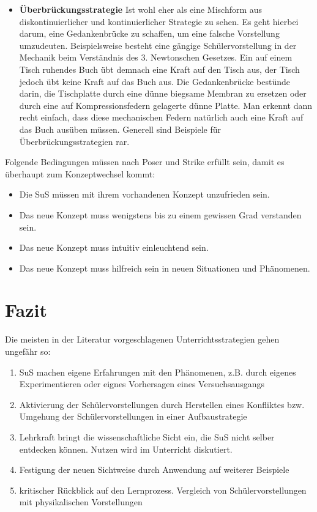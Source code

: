 \begin{itemize}
\item \textbf{{\"U}berbr{\"u}ckungsstrategie} Ist wohl eher als eine Mischform aus diskontinuierlicher und kontinuierlicher Strategie zu sehen. Es geht hierbei darum, eine Gedankenbr\"{u}cke zu schaffen, um eine falsche Vorstellung umzudeuten. Beispielsweise besteht eine g\"{a}ngige Sch\"{u}lervorstellung in der Mechanik beim Verst\"{a}ndnis des 3. Newtonschen Gesetzes. Ein auf einem Tisch ruhendes Buch \"{u}bt demnach eine Kraft auf den Tisch aus, der Tisch jedoch \"{u}bt keine Kraft auf das Buch aus. Die Gedankenbr\"{u}cke best\"{u}nde darin, die Tischplatte durch eine d\"{u}nne biegsame Membran zu ersetzen oder durch eine auf Kompressionsfedern gelagerte d\"{u}nne Platte. Man erkennt dann recht einfach, dass diese mechanischen Federn nat\"{u}rlich auch eine Kraft auf das Buch aus\"{u}ben m\"{u}ssen. Generell sind Beispiele f\"{u}r \"{U}berbr{\"u}ckungsstrategien rar.
\end{itemize}

Folgende Bedingungen m{\"u}ssen nach Poser und Strike erf{\"u}llt sein, damit es {\"u}berhaupt zum Konzeptwechsel kommt:

\begin{itemize}
\item Die SuS m{\"u}ssen mit ihrem vorhandenen Konzept unzufrieden sein.
\item Das neue Konzept muss wenigstens bis zu einem gewissen Grad verstanden sein.
\item Das neue Konzept muss intuitiv einleuchtend sein.
\item Das neue Konzept muss hilfreich sein in neuen Situationen und Ph{\"a}nomenen.
\end{itemize}

\bip\bip
\section{Fazit}
Die meisten in der Literatur vorgeschlagenen Unterrichtsstrategien gehen ungef{\"a}hr so:

\begin{enumerate}
\item 
SuS machen eigene Erfahrungen mit den Ph{\"a}nomenen, z.B. durch eigenes Experimentieren oder eignes Vorhersagen eines Versuchsausgangs
\item  
Aktivierung der Sch{\"u}lervorstellungen durch Herstellen eines Konfliktes bzw. Umgehung der Sch{\"u}lervorstellungen in einer Aufbaustrategie
\item
Lehrkraft bringt die wissenschaftliche Sicht ein, die SuS nicht selber entdecken k{\"o}nnen. Nutzen wird im Unterricht diskutiert.
\item
Festigung der neuen Sichtweise durch Anwendung auf weiterer Beispiele
\item
kritischer R{\"u}ckblick auf den Lernprozess. Vergleich von Sch{\"u}lervorstellungen mit physikalischen Vorstellungen
\end{enumerate}

